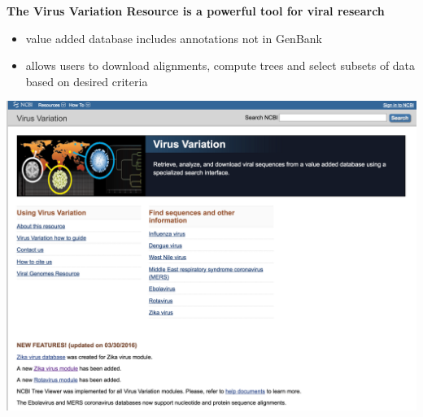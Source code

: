 \documentclass[landscape]{slides}
\begin{document}
\begin{slide}
\begin{center}
\textbf{The Virus Variation Resource is a powerful tool for viral research}

\small
\begin{itemize}
\item value added database includes annotations not in GenBank
\item allows users to download alignments, compute trees and select
  subsets of data based on desired criteria
\end{itemize}

\includegraphics[width=7in]{figs/viv-page1}

\vfill
\end{center}
\end{slide}
\end{document}
